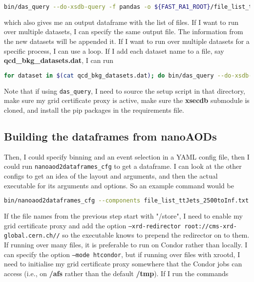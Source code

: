 \begin{lstlisting}[belowskip=-0.7cm, language=sh, numbers=none]
bin/das_query --do-xsdb-query -f pandas -o ${FAST_RA1_ROOT}/file_list_ttJets_2500toInf.txt /TTJets_HT-2500toInf_TuneCUETP8M1_13TeV-madgraphMLM-pythia8/RunIISummer16NanoAOD-PUMoriond17_05Feb2018_94X_mcRun2_asymptotic_v2_ext1-v1/NANOAODSIM
\end{lstlisting}

which also gives me an output dataframe with the list of files. If I want to run over multiple datasets, I can specify the same output file. The information from the new datasets will be appended it. If I want to run over multiple datasets for a specific process, I can use a loop. If I add each dataset name to a file, say \textbf{qcd\_bkg\_datasets.dat}, I can run

\begin{lstlisting}[belowskip=-0.7cm, language=sh, numbers=none]
for dataset in $(cat qcd_bkg_datasets.dat); do bin/das_query --do-xsdb-query -f pandas -o ./qcd_bkg_file_list.txt $dataset; done
\end{lstlisting}

Note that if using \texttt{das\_query}, I need to source the setup script in that directory, make sure my grid certificate proxy is active, make sure the \textbf{xsecdb} submodule is cloned, and install the pip packages in the requirements file.


\subsection{Building the dataframes from nanoAODs}

Then, I could specify binning and an event selection in a YAML config file, then I could run \texttt{nanoaod2dataframes\_cfg} to get a dataframe. I can look at the other configs to get an idea of the layout and arguments, and then the actual executable for its arguments and options. So an example command would be

\begin{lstlisting}[belowskip=-0.7cm, language=sh, numbers=none]
bin/nanoaod2dataframes_cfg --components file_list_ttJets_2500toInf.txt --dont-use-nanoaodtools -o single_top_test fast_ra1/trees_to_dataframe/configs/nanoaod_esh_ttH.yaml
\end{lstlisting}

If the file names from the previous step start with "/store", I need to enable my grid certificate proxy and add the option \texttt{--xrd-redirector root://cms-xrd-global.cern.ch//} so the executable knows to prepend the redirector on to them. If running over many files, it is preferable to run on Condor rather than locally. I can specify the option \texttt{--mode htcondor}, but if running over files with xrootd, I need to initialise my grid certificate proxy somewhere that the Condor jobs can access (i.e., on \textbf{/afs} rather than the default \textbf{/tmp}). If I run the commands

